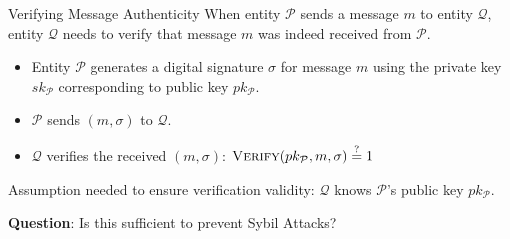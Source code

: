 \documentclass[aspectratio=169,10pt]{beamer}
\newenvironment{outlineblock}[1][]
{\begin{tcolorbox}[colframe=black, colback=white, boxrule=1pt, boxsep=5pt]}
{\end{tcolorbox}}
\begin{document}
\begin{frame}{Verifying Message Authenticity}
When entity $\mathcal{P}$ sends a message $m$ to entity $\mathcal{Q}$, 
entity $\mathcal{Q}$ needs to verify that message $m$ was indeed received from $\mathcal{P}$.

\vspace{0.5em}

\begin{itemize}
    \item Entity $\mathcal{P}$ generates a digital signature $\sigma$ for message $m$ using the private key $sk_{\mathcal{P}}$ corresponding to public key $pk_{\mathcal{P}}$.
    \item $\mathcal{P}$ sends $(m, \sigma)$ to $\mathcal{Q}$.
    \item $\mathcal{Q}$ verifies the received $(m, \sigma)$: $\textsc{Verify}(pk_{\mathcal{P}}, m, \sigma) \stackrel{?}{=} 1$
\end{itemize}

\begin{outlineblock}[Assumption Required for Verifying Message Authenticity with Digital Signatures]
    Assumption needed to ensure verification validity: $\mathcal{Q}$ knows $\mathcal{P}$'s public key $pk_{\mathcal{P}}$.
\end{outlineblock}

\textbf{Question}: Is this sufficient to prevent Sybil Attacks?

\end{frame}
\end{document}
